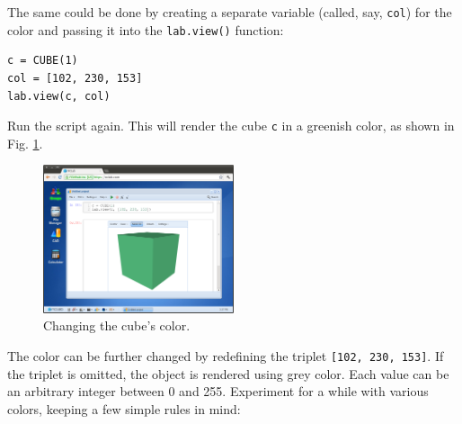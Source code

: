 \noindent
The same could be done by creating a separate variable (called, say, {\tt col})
for the color and passing it into the {\tt lab.view()} function:\\

\begin{bbox}
\begin{verbatim}
c = CUBE(1)
col = [102, 230, 153]
lab.view(c, col)
\end{verbatim}
\end{bbox}
\vspace{6mm}

\noindent
Run the script again.
This will render the cube {\tt c} in a greenish color, as shown in 
Fig. \ref{fig:cube2}.

\begin{figure}[!ht]
\begin{center}
\includegraphics[width=0.5\textwidth]{img/cube2.png}
\end{center}
\vspace{-2mm}
\caption{Changing the cube's color.}
\vspace{2mm}
\label{fig:cube2}
\end{figure}
\noindent
The color can be further changed by redefining the triplet {\tt [102, 230, 153]}. 
If the triplet is omitted, the object is rendered using grey color. Each value can 
be an arbitrary integer between 0 and 255. Experiment for a while with various colors, keeping a few 
simple rules in mind:

